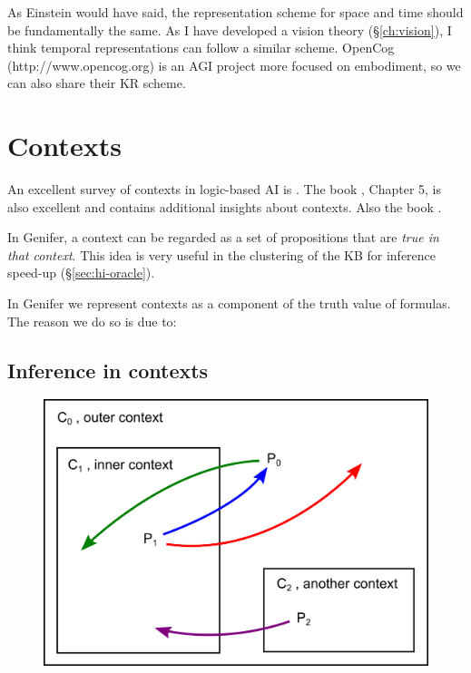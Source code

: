 As Einstein would have said, the representation scheme for space and time should be fundamentally the same.  As I have developed a vision theory (\S\ref{ch:vision}), I think temporal representations can follow a similar scheme.  OpenCog (http://www.opencog.org) is an AGI project more focused on embodiment, so we can also share their KR scheme.

\section{Contexts}
\label{sec:contexts}

An excellent survey of contexts in logic-based AI is \citep*{Akman1996}.  The book \citep*{Sowa2000}, Chapter 5, is also excellent and contains additional insights about contexts.  Also the book \citep*{Bonzon2000}.

In Genifer, a context can be regarded as a set of propositions that are \textit{true in that context}.  This idea is very useful in the clustering of the KB for inference speed-up (\S\ref{sec:hi-oracle}).

In Genifer we represent contexts as a component of the truth value of formulas.  The reason we do so is due to:

\subsection{Inference in contexts}

\begin{figure}[H]
\centering
\includegraphics[scale=0.75]{inference-in-context.png}
\end{figure}


